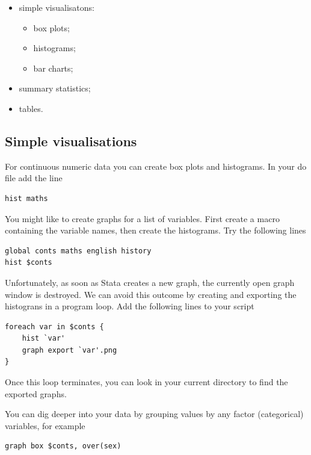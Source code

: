 \documentclass[
]{article}
\providecommand{\tightlist}{%
  \setlength{\itemsep}{0pt}\setlength{\parskip}{0pt}}
\begin{document}
\begin{itemize}
\item
  simple visualisatons:

  \begin{itemize}
  \tightlist
  \item
    box plots;
  \item
    histograms;
  \item
    bar charts;
  \end{itemize}
\item
  summary statistics;
\item
  tables.
\end{itemize}

\hypertarget{simple-visualisations}{%
\subsection{Simple visualisations}\label{simple-visualisations}}

For continuous numeric data you can create box plots and histograms. In your do file add the line

\begin{verbatim}
hist maths
\end{verbatim}

You might like to create graphs for a list of variables. First create a macro containing the variable names, then create the histograms. Try the following lines

\begin{verbatim}
global conts maths english history
hist $conts
\end{verbatim}

Unfortunately, as soon as Stata creates a new graph, the currently open graph window is destroyed. We can avoid this outcome by creating and exporting the histograns in a program loop. Add the following lines to your script

\begin{verbatim}
foreach var in $conts {
    hist `var'
    graph export `var'.png
}
\end{verbatim}

Once this loop terminates, you can look in your current directory to find the exported graphs.

You can dig deeper into your data by grouping values by any factor (categorical) variables, for example

\begin{verbatim}
graph box $conts, over(sex)
\end{verbatim}
\end{document}
